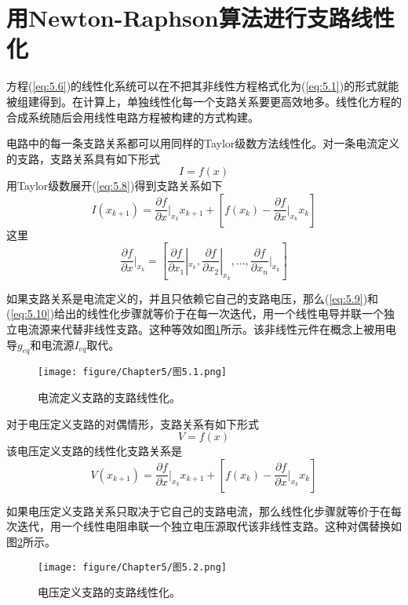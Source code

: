 \section{用Newton-Raphson算法进行支路线性化}
方程(\ref{eq:5.6})的线性化系统可以在不把其非线性方程格式化为(\ref{eq:5.1})的形式就能被组建得到。在计算上，单独线性化每一个支路关系要更高效地多\cite{ref-37,ref-38}。线性化方程的合成系统随后会用线性电路方程被构建的方式构建。

电路中的每一条支路关系都可以用同样的Taylor级数方法线性化。对一条电流定义的支路，支路关系具有如下形式
\begin{equation}
    I = f(x)
    \label{eq:5.8}
\end{equation}
用Taylor级数展开(\ref{eq:5.8})得到支路关系如下
\begin{equation}
    I(x_{k+1})=\frac{\partial f}{\partial x}|_{x_k}x_{k+1} + [f(x_k)-\frac{\partial f}{\partial x}|_{x_k}x_{k}]
    \label{eq:5.9}
\end{equation}
这里
\begin{equation}
    \frac{\partial f}{\partial x}|_{x_k} = [\frac{\partial f}{\partial x_1}|_{x_k},\frac{\partial f}{\partial x_2}|_{x_k},\dots,\frac{\partial f}{\partial x_n}|_{x_k}]
    \label{eq:5.10}
\end{equation}

如果支路关系是电流定义的，并且只依赖它自己的支路电压，那么(\ref{eq:5.9})和(\ref{eq:5.10})给出的线性化步骤就等价于在每一次迭代，用一个线性电导并联一个独立电流源来代替非线性支路。这种等效如图\ref{图5.1}所示。该非线性元件在概念上被用电导$g_{eq}$和电流源$I_{eq}$取代。
\begin{figure}[htbp]
\small
    \centering
    \texttt{[image: figure/Chapter5/图5.1.png]}
    \caption{电流定义支路的支路线性化。}
    \label{图5.1}
\end{figure}

对于电压定义支路的对偶情形，支路关系有如下形式
\begin{equation}
    V = f(x)
    \label{eq:5.11}
\end{equation}
该电压定义支路的线性化支路关系是
\begin{equation}
    V(x_{k+1}) = \frac{\partial f}{\partial x}|_{x_k}x_{k+1} + [f(x_k)-\frac{\partial f}{\partial x}|_{x_k}x_k]
    \label{eq:5.12}
\end{equation}

如果电压定义支路关系只取决于它自己的支路电流，那么线性化步骤就等价于在每次迭代，用一个线性电阻串联一个独立电压源取代该非线性支路。这种对偶替换如图\ref{图5.2}所示。
\begin{figure}[htbp]
\small
    \centering
    \texttt{[image: figure/Chapter5/图5.2.png]}
    \caption{电压定义支路的支路线性化。}
    \label{图5.2}
\end{figure}

